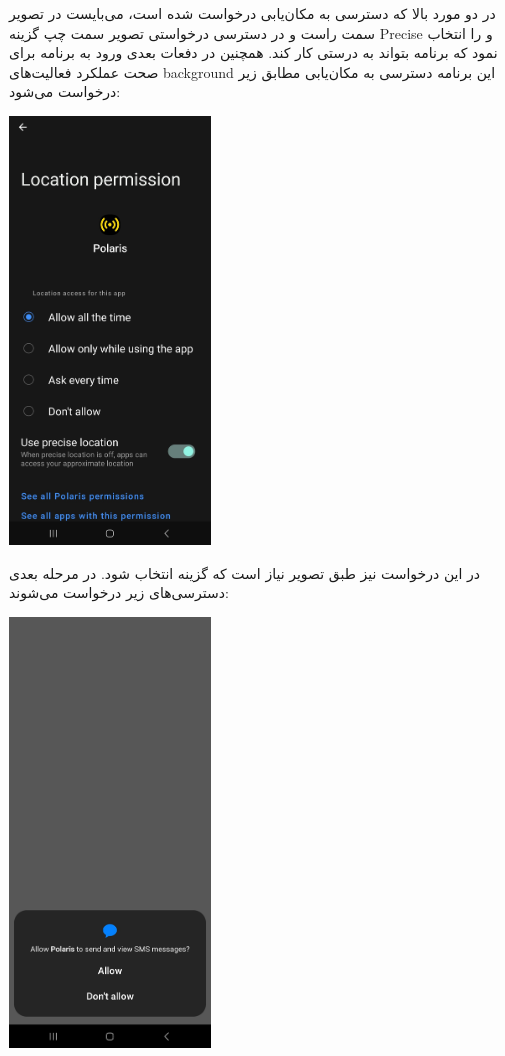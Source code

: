 \begin{itemize}
\begin{center}
	\end{center}
	در دو مورد بالا که دسترسی به مکان‌یابی درخواست شده است، می‌بایست در  تصویر سمت راست  و در دسترسی درخواستی تصویر سمت چپ گزینه Precise و  را انتخاب نمود که برنامه بتواند به درستی کار کند. همچنین در دفعات بعدی ورود به برنامه برای صحت عملکرد فعالیت‌های background این برنامه دسترسی به مکان‌یابی مطابق زیر درخواست می‌شود:
	\begin{center}
		\includegraphics[width=0.4\textwidth]{images/permission-location-3.jpg} 
	\end{center}
	در این درخواست نیز طبق تصویر نیاز است که گزینه  انتخاب شود.
	در مرحله بعدی دسترسی‌های زیر درخواست می‌شوند:
	\begin{center}
		\includegraphics[width=0.4\textwidth]{images/permission-sms.jpg}

\end{center}
\end{itemize}
